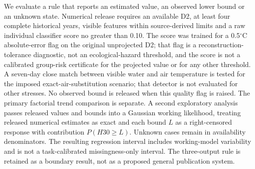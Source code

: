 \documentclass[draft,linenumbers]{agujournal2025}
\begin{document}
We evaluate a rule that reports an estimated value, an observed lower bound or an unknown state. Numerical release requires an available D2, at least four complete historical years, visible features within source-derived limits and a raw individual classifier score no greater than 0.10. The score was trained for a 0.5$^{\circ}$C absolute-error flag on the original unprojected D2; that flag is a reconstruction-tolerance diagnostic, not an ecological-hazard threshold, and the score is not a calibrated group-risk certificate for the projected value or for any other threshold. A seven-day close match between visible water and air temperature is tested for the imposed exact-air-substitution scenario; that detector is not evaluated for other stresses. No observed bound is released when this quality flag is raised. The primary factorial trend comparison is separate. A second exploratory analysis passes released values and bounds into a Gaussian working likelihood, treating released numerical estimates as exact and each bound $L$ as a right-censored response with contribution $P(H30\ge L)$. Unknown cases remain in availability denominators. The resulting regression interval includes working-model variability and is not a task-calibrated missingness-only interval. The three-output rule is retained as a boundary result, not as a proposed general publication system.




\end{document}
